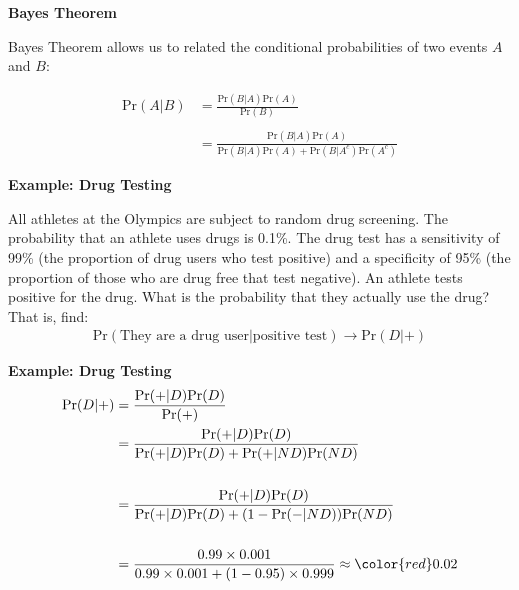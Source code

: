 \documentclass[12pt,xcolor=svgnames]{beamer}
\newcommand{\rd}{\color{red}}
\newcommand{\theme}{\color{FireBrick}}
\newcommand{\sk}{\vspace{.4cm}}
\newcommand{\nsk}{\vspace{-.4cm}}
\newcommand{\chap}[1]{{\theme \Large \bf #1} \sk}
\newcommand{\pr}{\text{Pr}}
\begin{document}
%
%

\begin{frame}
\chap{Bayes Theorem} 

Bayes Theorem allows us to related the conditional probabilities of two events $A$ and $B$:

\begin{align*}
\pr(A|B) & = \frac{\pr(B|A)\pr(A)}{\pr(B)}\\
&\\
& =  \frac{\pr(B|A)\pr(A)}{\pr(B|A)\pr(A) + \pr(B|A^c)\pr(A^c)}
\end{align*}

\end{frame}


\begin{frame}
\chap{Example: Drug Testing}

All athletes at the Olympics are subject to random drug screening. The probability that an athlete uses drugs is 0.1\%. The drug test has a sensitivity of 99\% (the proportion of drug users who test positive) and a specificity of 95\% (the proportion of those who are drug free that test negative). An athlete tests positive for the drug. What is the probability that they actually use the drug? That is, find:
\begin{align*}
\pr(\text{They are a drug user}|\text{positive test})\rightarrow \pr(D |+ )
\end{align*}

\end{frame}

\begin{frame}
\chap{Example: Drug Testing}
\nsk
\begin{align*}
\pr(D |+ ) & = \frac{\pr(+|D)\pr(D)}{\pr(+)}\\
& =  \frac{\pr(+|D)\pr(D)}{\pr(+|D)\pr(D) + \pr(+|ND)\pr(ND)}\\
&\\
& =  \frac{\pr(+|D)\pr(D)}{\pr(+|D)\pr(D) + (1-\pr(-|ND))\pr(ND)}\\
&\\
& = \frac{0.99\times0.001}{0.99\times0.001 + (1-0.95)\times0.999} \approx {\rd 0.02} 
\end{align*}


\end{frame}
\end{document}

